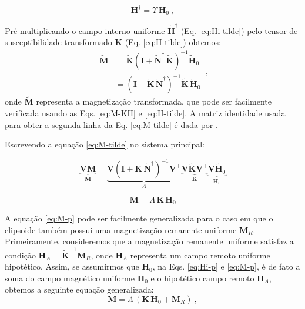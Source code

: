 \begin{equation}
{\mathbf{H}^{\dagger}} =  
{\Upsilon} \, 
{\mathbf{H}_{0}} \: ,
\label{eq:Hi-p}
\end{equation}

Pré-multiplicando o campo interno uniforme $\tilde{\mathbf{H}}^{\dagger}$
(Eq. \ref{eq:Hi-tilde}) pelo tensor de susceptibilidade transformado $\tilde{\mathbf{K}}$ (Eq. \ref{eq:H-tilde}) obtemos:
\begin{equation}
\begin{split}
\tilde{\mathbf{M}} 
&= \tilde{\mathbf{K}} 
\left( \mathbf{I} + \tilde{\mathbf{N}}^{\dagger} \, \tilde{\mathbf{K}} \right)^{-1}
\tilde{\mathbf{H}}_{0} \\
&=  
\left( \mathbf{I} + \tilde{\mathbf{K}} \, \tilde{\mathbf{N}}^{\dagger} \right)^{-1}
\tilde{\mathbf{K}} \, \tilde{\mathbf{H}}_{0}
\end{split} \: ,
\label{eq:M-tilde}
\end{equation}
onde $\tilde{\mathbf{M}}$ representa a magnetização transformada, que pode ser facilmente verificada usando as Eqs. \ref{eq:M-KH} e \ref{eq:H-tilde}. A matriz identidade usada para obter a segunda linha da Eq. \ref{eq:M-tilde} é dada por \citet[p. ~151]{searle1982}.

Escrevendo a equação \ref{eq:M-tilde} no sistema principal:

\begin{equation}
\underbrace{\mathbf{V} \tilde{\mathbf{M}}}_{\mathbf{M}} =
\underbrace{\mathbf{V} \left (\mathbf{I} + \tilde{\mathbf{K}} \, \tilde{\mathbf{N}}^{\dagger} \right)^{-1} \mathbf{V}^{\top}}_{\Lambda}
\underbrace{\mathbf{V} \tilde{\mathbf{K}} \mathbf{V}^{\top}}_{\mathbf{K}}
\underbrace{\mathbf{V} \tilde{\mathbf{H}}_{0}}_{\mathbf{H}_{0}}
\label{eq:M}
\end{equation}

\begin{equation}
{\mathbf{M}} =
{\Lambda} \,
{\mathbf{K}} \,
{\mathbf{H}_{0}}
\label{eq:M-p}
\end{equation}

A equação \ref{eq:M-p} pode ser facilmente generalizada para o caso em que o elipsoide também possui uma magnetização remanente uniforme ${\mathbf{M}}_{R}$. Primeiramente, consideremos que a magnetização remanente uniforme satisfaz a condição ${\mathbf{H}}_{A} = \tilde{\mathbf{K}}^{-1} {\mathbf{M}}_{R}$, onde ${\mathbf{H}}_{A}$ representa um campo remoto uniforme hipotético. Assim, se assumirmos que ${\mathbf{H}}_{0}$,
na Eqs. \ref{eq:Hi-p} e \ref{eq:M-p}, é de fato a soma do campo magnético uniforme ${\mathbf{H}}_{0}$ e o hipotético campo remoto ${\mathbf{H}}_{A}$, obtemos a seguinte equação generalizada:
\begin{equation}
{\mathbf{M}} =  
{\Lambda} \,
\left( {\mathbf{K}} \, {\mathbf{H}}_{0} + {\mathbf{M}}_{R} \right) \: ,
\label{eq:M-p-remanence}
\end{equation}

